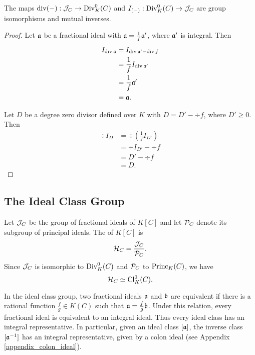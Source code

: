 \begin{theorem}
  \label{thm_ideals_divisors_isomorphic}
  The maps $\div(-) : \cal J_C \to \Div_K^0(C)$ and $I_{(-)} : \Div_K^0(C) \to \cal J_C$
  are group isomorphisms and mutual inverses.
\end{theorem}
\begin{proof}
  Let $\frak a$ be a fractional ideal with
  $\frak a = \frac 1 f \frak a'$,
  where $\frak a'$ is integral. Then
  \begin{align*}
    I_{\div \frak a}
      &= I_{\div \frak a' - \div f} \\
      &= \frac 1 f I_{\div \frak a'} \\
      &= \frac 1 f \frak a' \\
      &= \frak a.
  \end{align*}
  
  Let $D$ be a degree zero divisor defined over $K$ with
  $D = D' - \div f$, where $D' \geq 0$. Then
  \begin{align*}
    \div I_D
      &= \div \left( \frac 1 f I_{D'} \right) \\
      &= \div I_{D'} - \div f \\
      &= D' - \div f \\
      &= D.
  \end{align*}
\end{proof}




\subsection{The Ideal Class Group}

Let $\cal J_C$ be the group of fractional ideals of $K[C]$ and let $\cal P_C$ denote its subgroup of principal ideals.
The  of $K[C]$ is
\[ \cal H_C = \frac {\cal J_C} {\cal P_C}. \]
Since $\cal J_C$ is isomorphic to $\Div_K^0(C)$ and $\cal P_C$ to $\Princ_K(C)$, we have
\[ \cal H_C \simeq \Cl_K^0(C). \]

In the ideal class group, two fractional ideals $\frak a$ and $\frak b$ are equivalent
if there is a rational function $\frac f g \in K(C)$ such that $\frak a = \frac f g \frak b$.
Under this relation, every fractional ideal is equivalent to an integral ideal.
Thus every ideal class has an integral representative.
In particular, given an ideal class $[\frak a]$, the inverse class $[\frak a\inv]$ has an integral representative,
given by a colon ideal (see Appendix \ref{appendix_colon_ideal}).

